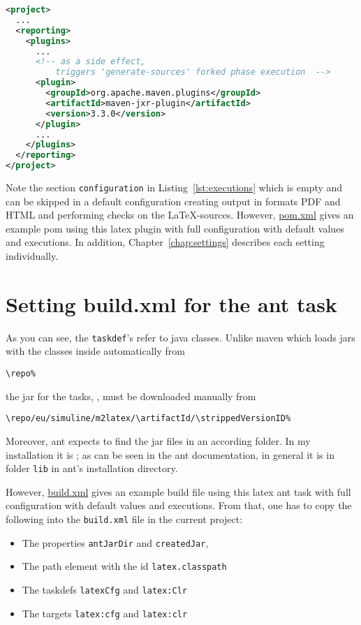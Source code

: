 \begin{lstlisting}[language=XML, basicstyle=\footnotesize,
escapechar=|,
float, captionpos=hb, label={lst:forkJxr}, 
caption={Forked execution with jxr plugin}]
<project>
  ...
  <reporting>
    <plugins>
      ...
      <!-- as a side effect, 
          triggers 'generate-sources' forked phase execution  -->
      <plugin>
        <groupId>org.apache.maven.plugins</groupId>
        <artifactId>maven-jxr-plugin</artifactId>
        <version>3.3.0</version>
      </plugin>
      ...
    </plugins>
  </reporting>
</project>
\end{lstlisting}

Note the section \texttt{configuration} in Listing~\ref{lst:executions}
which is empty and can be skipped in a default configuration
creating output in formats PDF and HTML and performing checks on the \LaTeX-sources. 
However, \href{\urlSite fromMain/pom4pdf.xml}{pom.xml} 
gives an example pom using this latex plugin 
with full configuration with default values and executions.
In addition, Chapter~\ref{chap:settings} describes each setting individually. 
\medskip



\section{Setting build.xml for the ant task}\label{sec:xmlBuild}

As you can see, the \texttt{taskdef}'s refer to java classes.
Unlike maven which loads jars with the classes inside automatically
from
% 
\begin{Verbatim}[fontsize=\small, commandchars=\\\{\}]
\repo%
\end{Verbatim}
%
the jar for the tasks, \createdJar,
must be downloaded manually from
%
\begin{Verbatim}[fontsize=\scriptsize, commandchars=\\\{\}]
\repo/eu/simuline/m2latex/\artifactId/\strippedVersionID%
\end{Verbatim}
%
Moreover, ant expects to find the jar files in an according folder.
In my installation it is \antJarDir;
as can be seen in the ant documentation,
in general it is in folder \texttt{lib} in ant's installation directory. 

However, \href{\urlSite build.xml}{build.xml} 
gives an example build file using this latex ant task 
with full configuration with default values and executions.
From that, one has to copy the following
into the \texttt{build.xml} file in the current project:
%
\begin{itemize}
\item The properties \texttt{antJarDir} and \texttt{createdJar}, 
\item The path element with the id \texttt{latex.classpath}
\item The taskdefs \texttt{latexCfg}  and \texttt{latex:Clr}
\item The  targets \texttt{latex:cfg} and \texttt{latex:clr}
\end{itemize}

